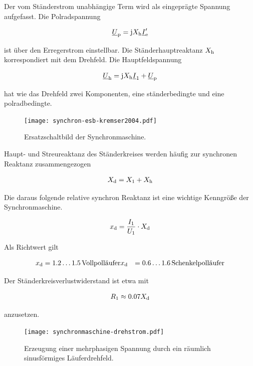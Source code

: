 Der vom Ständerstrom unabhängige Term wird als eingeprägte Spannung aufgefasst.
Die Polradspannung

\begin{align}
\underline{U}_{\mathrm{p}} = \mathrm{j}X_{\mathrm{h}}\underline{I}'_{\mathrm{e}}
\end{align}

ist über den Erregerstrom einstellbar.
Die Ständerhauptreaktanz $X_{\mathrm{h}}$ korrespondiert mit dem Drehfeld.
Die Hauptfeldspannung

\begin{align}
\underline{U}_{\mathrm{h}} = \mathrm{j} X_{\mathrm{h}} \underline{I}_{\mathrm{1}} + \underline{U}_{\mathrm{p}}
\end{align}

hat wie das Drehfeld zwei Komponenten, eine ständerbedingte und eine polradbedingte.

\begin{figure}[!htb]
\centering
\texttt{[image: synchron-esb-kremser2004.pdf]}
\label{fig:esb-kremser}
\caption{Ersatzschaltbild der Synchronmaschine.}
\end{figure}

Haupt- und Streureaktanz des Ständerkreises werden häufig zur synchronen Reaktanz zusammengezogen

\begin{align}
X_{\mathrm{d}} = X_{\mathrm{1}} + X_{\mathrm{h}}
\end{align}

Die daraus folgende relative synchron Reaktanz ist eine wichtige Kenngröße der Synchronmaschine.

\begin{align}
x_{\mathrm{d}} = \frac{I_{\mathrm{1}}}{U_{\mathrm{1}}}\cdot X_{\mathrm{d}}
\end{align}

Als Richtwert gilt

\begin{align*}
x_{\mathrm{d}} &= 1.2 \ldots 1.5\,\text{Vollpolläufer}
x_{\mathrm{d}} &= 0.6 \ldots 1.6\,\text{Schenkelpolläufer}
\end{align*}

Der Ständerkreisverlustwiderstand ist etwa mit 

\begin{align}
R_{\mathrm{1}} \approx 0.07 X_{\mathrm{d}}
\end{align}

anzusetzen.

\begin{figure}[!htb]
\centering
\texttt{[image: synchronmaschine-drehstrom.pdf]}
\label{fig:drehstromwicklung}
\caption{Erzeugung einer mehrphasigen Spannung durch ein räumlich sinusförmiges Läuferdrehfeld.}
\end{figure}

